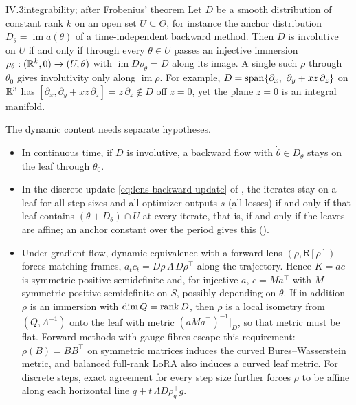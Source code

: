 \begin{proposition}{IV.3}{integrability; after Frobenius' theorem}
Let $D$ be a smooth distribution of constant rank $k$ on an open set $U\subseteq\Theta$, for instance the anchor
distribution $D_\theta=\operatorname{im}a(\theta)$ of a time-independent backward method. Then $D$ is involutive on
$U$ if and only if through every $\theta\in U$ passes an injective immersion $\rho_\theta:(\mathbb{R}^k,0)\to(U,\theta)$ with
$\operatorname{im}D\rho_\theta=D$ along its image. A single such $\rho$ through $\theta_0$ gives involutivity only
along $\operatorname{im}\rho$. For example, $D=\spanop\{\partial_x,\ \partial_y+xz\,\partial_z\}$ on $\mathbb{R}^3$ has
$[\partial_x,\partial_y+xz\,\partial_z]=z\,\partial_z\notin D$ off $z=0$, yet the plane $z=0$ is an integral manifold.

The dynamic content needs separate hypotheses.
\begin{itemize}
  \item In continuous time, if $D$ is involutive, a backward flow with $\dot\theta\in D_\theta$ stays on the leaf
  through $\theta_0$.
  \item In the discrete update \eqref{eq:lens-backward-update} of , the iterates stay on a
  leaf for all step sizes and all optimizer outputs $s$ (all losses) if and only if that leaf contains
  $(\theta+D_\theta)\cap U$ at every iterate, that is, if and only if the leaves are affine; an anchor constant over
  the period gives this ().
  \item Under gradient flow, dynamic equivalence with a forward lens $(\rho,\mathsf R[\rho])$ forces matching frames,
  $a_tc_t=D\rho\,\Lambda\,D\rho^\top$ along the trajectory. Hence $K=ac$ is symmetric positive semidefinite and, for
  injective $a$, $c=Ma^\top$ with $M$ symmetric positive semidefinite on $S$, possibly depending on $\theta$. If in
  addition $\rho$ is an immersion with $\dim Q=\operatorname{rank} D$, then $\rho$ is a local isometry from $(Q,\Lambda^{-1})$ onto the
  leaf with metric $(aMa^\top)^{-1}|_D$, so that metric must be flat. Forward methods with gauge fibres escape this
  requirement: $\rho(B)=BB^\top$ on symmetric matrices induces the curved Bures--Wasserstein metric, and balanced
  full-rank LoRA also induces a curved leaf metric. For discrete steps, exact agreement for every step size further
  forces $\rho$ to be affine along each horizontal line $q+t\,\Lambda D\rho_q^\top g$.
\end{itemize}


\end{proposition}
